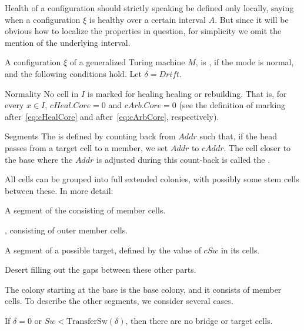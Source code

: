 \documentclass[12pt]{memoir}
\newcommand{\fld}[1]{\ensuremath{\textit{#1}}}
\newcommand{\Addr}{\fld{Addr}}
\newcommand{\cAddr}{\fld{cAddr}}
\newcommand{\cArb}{\fld{cArb}}
\newcommand{\Core}{\fld{Core}}
\newcommand{\Drift}{\fld{Drift}}
\newcommand{\cHeal}{\fld{cHeal}}
\newcommand{\Sweep}{\fld{Sw}}
\newcommand{\cSweep}{\fld{cSw}}
\newcommand{\TransferSw}{\mathrm{TransferSw}}
\begin{document}
\begin{definition}\label{def:healthy}
Health of a configuration should strictly speaking be defined only 
locally, saying when a configuration \( \xi \)
is healthy over a certain interval \( A \).
But since it will be obvious how to localize the properties in question,
for simplicity we omit the mention of the underlying interval.

    A configuration \( \xi \) of a generalized Turing machine \( M \),
    is , if the mode is normal, and the following conditions hold.
    Let \( \delta = \Drift \).

\begin{flushdescription}

     \item[Normality]
           No cell in \( I \) is marked for healing healing or rebuilding.
           That is, for every \( x \in I \), \( \cHeal.\Core = 0 \) and
           \( \cArb.\Core = 0 \)
          (see the definition of marking after~\eqref{eq:cHealCore}
           and after~\eqref{eq:cArbCore}, respectively).

\item[Segments]
        The  is defined by counting back from \( \Addr \) such that, if the head
        passes from a target cell to a member, 
        we set \( \Addr \) to \( \cAddr \).
        The cell closer to the base where the \( \Addr \) is adjusted during
        this count-back is called the .

    All cells can be grouped into full extended colonies,
with possibly some stem cells between these.
In more detail:
  \begin{bullets}
  \item A segment of the  consisting of member cells.
  \item {}, consisting of outer member cells.
   \item A segment of a possible target, defined by the value of \( \cSweep \) in its cells.
    \item Desert filling out the gaps between these other parts.
  \end{bullets}

        The colony starting at the base is the base colony, and it consists of member cells.
        To describe the other segments, we consider several cases.
        \begin{bullets}
        \item 
        If \( \delta=0 \) or \( \Sweep < \TransferSw(\delta) \), 
        then there are no bridge or target cells.


\end{bullets}
\end{flushdescription}
\end{definition}
\end{document}
